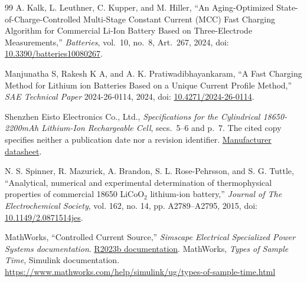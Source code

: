 \documentclass[a4paper,10pt,twocolumn]{article}
\begin{document}
\begin{thebibliography}{99}
A. Kalk, L. Leuthner, C. Kupper, and M. Hiller,
``An Aging-Optimized State-of-Charge-Controlled Multi-Stage Constant Current (MCC) Fast Charging Algorithm for Commercial Li-Ion Battery Based on Three-Electrode Measurements,''
\emph{Batteries}, vol.~10, no.~8, Art.~267, 2024,
doi: \href{https://doi.org/10.3390/batteries10080267}{10.3390/batteries10080267}.

Manjunatha S, Rakesh K A, and A. K. Pratiwadibhayankaram,
``A Fast Charging Method for Lithium ion Batteries Based on a Unique Current Profile Method,''
\emph{SAE Technical Paper} 2024-26-0114, 2024,
doi: \href{https://doi.org/10.4271/2024-26-0114}{10.4271/2024-26-0114}.

Shenzhen Eisto Electronics Co., Ltd., \emph{Specifications for the Cylindrical 18650-2200mAh Lithium-Ion Rechargeable Cell}, secs.~5--6 and p.~7. The cited copy specifies neither a publication date nor a revision identifier.
\href{https://www.eistoelectronics.com/web/userfiles/download/ICR18650-2200mAhBatteryDatasheet.pdf}{Manufacturer datasheet}.

N. S. Spinner, R. Mazurick, A. Brandon, S. L. Rose-Pehrsson, and S. G. Tuttle,
``Analytical, numerical and experimental determination of thermophysical properties of commercial 18650 LiCoO$_2$ lithium-ion battery,''
\textit{Journal of The Electrochemical Society}, vol. 162, no. 14, pp. A2789--A2795, 2015,
doi: \href{https://doi.org/10.1149/2.0871514jes}{10.1149/2.0871514jes}.

MathWorks, ``Controlled Current Source,'' \textit{Simscape Electrical Specialized Power Systems documentation}.
\href{https://www.mathworks.com/help/releases/R2023b/sps/powersys/ref/controlledcurrentsource.html}{R2023b documentation}.
MathWorks, \emph{Types of Sample Time}, Simulink documentation.
\url{https://www.mathworks.com/help/simulink/ug/types-of-sample-time.html}

\end{thebibliography}
\end{document}
